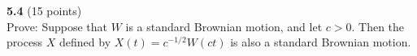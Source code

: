 \documentclass{article}
\begin{document}
\noindent \textbf{5.4} (15 points) \\ Prove: Suppose that $W$ is a standard Brownian motion, and let $c > 0$. Then the process $X$ defined by $X(t) = c^{-1/2} W(ct)$ is also a standard Brownian motion.

%
%
%
%
%
\end{document}

